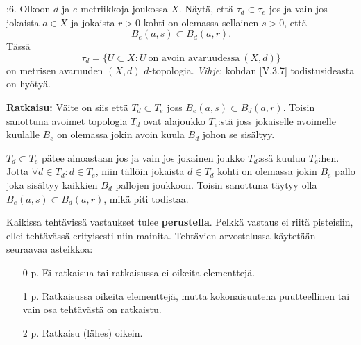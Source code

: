 \documentclass[12pt,a4paper,leqno]{amsart}
\begin{document}
:6.   Olkoon $d$ ja $e$ metriikkoja joukossa $X$. Näytä, että
$\tau_d \subset \tau_e$ jos ja vain jos jokaista $a \in X$ ja jokaista $r > 0$
kohti on olemassa sellainen $s > 0$, että
\[
B_e(a,s) \subset B_d(a,r).
\]
Tässä 
\[
\tau_d = \{U \subset X: U\  \textrm{on avoin avaruudessa}\ (X,d)\}
\]
 on  metrisen avaruuden $(X,d)$ $d$-topologia.
\textit{Vihje}: kohdan [V,3.7]  todistusideasta on hyötyä.

\textbf{Ratkaisu: }
Väite on siis että $T_d \subset T_e$ joss $B_e(a,s) \subset B_d(a,r)$. Toisin sanottuna avoimet topologia $T_d$ ovat alajoukko $T_e$:stä joss jokaiselle avoimelle kuulalle $B_e$ on olemassa jokin avoin kuula $B_d$ johon se sisältyy.

$T_d \subset T_e$ pätee ainoastaan jos ja vain jos jokainen joukko $T_d$:ssä kuuluu $T_e$:hen. Jotta $\forall d \in T_d: d \in T_e$, niin tällöin jokaista $d \in T_d$ kohti on olemassa jokin $B_e$ pallo joka sisältyy kaikkien $B_d$ pallojen joukkoon. Toisin sanottuna täytyy olla $B_e(a,s) \subset B_d(a,r)$, mikä piti todistaa.

\bigskip

Kaikissa tehtävissä vastaukset tulee \textbf{perustella}. Pelkkä vastaus ei riitä pisteisiin, ellei tehtävässä erityisesti niin mainita.
Tehtävien arvostelussa käytetään seuraavaa asteikkoa: 
\begin{itemize}
\item [0 p.] Ei ratkaisua tai ratkaisussa ei oikeita elementtejä.
\item [1 p.] Ratkaisussa oikeita elementtejä, mutta kokonaisuutena puutteellinen tai vain osa tehtävästä on ratkaistu.
\item [2 p.] Ratkaisu (lähes) oikein.
\end{itemize}
\end{document}
